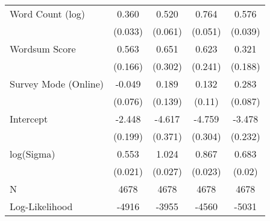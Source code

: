 \begin{table}[ht]
\begin{tabular}{lcccc}
  Word Count (log) &  0.360 &  0.520 &  0.764 &  0.576 \\ 
   & (0.033) & (0.061) & (0.051) & (0.039) \\ 
  Wordsum Score &  0.563 &  0.651 &  0.623 &  0.321 \\ 
   & (0.166) & (0.302) & (0.241) & (0.188) \\ 
  Survey Mode (Online) & -0.049 &  0.189 &  0.132 &  0.283 \\ 
   & (0.076) & (0.139) & (0.11) & (0.087) \\ 
  Intercept & -2.448 & -4.617 & -4.759 & -3.478 \\ 
   & (0.199) & (0.371) & (0.304) & (0.232) \\ 
  log(Sigma) &  0.553 &  1.024 &  0.867 &  0.683 \\ 
   & (0.021) & (0.027) & (0.023) & (0.02) \\ 
   \hline
N & 4678 & 4678 & 4678 & 4678 \\ 
  Log-Likelihood & -4916 & -3955 & -4560 & -5031 \\ 
   \hline
\end{tabular}
\endgroup
\end{table}
